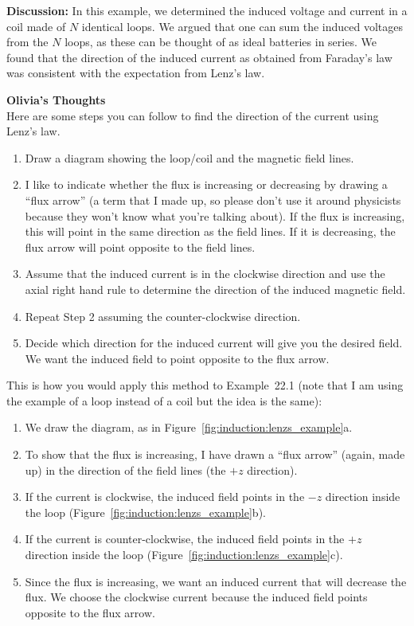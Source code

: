 \begin{framed}
\begin{framed}
\textbf{Discussion:} In this example, we determined the induced voltage and current in a coil made of $N$ identical loops. We argued that one can sum the induced voltages from the $N$ loops, as these can be thought of as ideal batteries in series. We found that the direction of the induced current as obtained from Faraday's law was consistent with the expectation from Lenz's law.
\end{framed}
\end{framed}

\begin{framed}
\textbf{Olivia's Thoughts}\\
Here are some steps you can follow to find the direction of the current using Lenz's law.

\begin{enumerate}
\item Draw a diagram showing the loop/coil and the magnetic field lines.
\item I like to indicate whether the flux is increasing or decreasing by drawing a ``flux arrow'' (a term that I made up, so please don't use it around physicists because they won't know what you're talking about). If the flux is increasing, this will point in the same direction as the field lines. If it is decreasing, the flux arrow will point opposite to the field lines.
\item Assume that the induced current is in the clockwise direction and use the axial right hand rule to determine the direction of the induced magnetic field.
\item Repeat Step 2 assuming the counter-clockwise direction.
\item Decide which direction for the induced current will give you the desired field. We want the induced field to point opposite to the flux arrow.
\end{enumerate}

This is how you would apply this method to Example~22.1 (note that I am using the example of a loop instead of a coil but the idea is the same):

\begin{enumerate}
\item We draw the diagram, as in Figure~\ref{fig:induction:lenzs_example}a.
\item To show that the flux is increasing, I have drawn a ``flux arrow'' (again, made up) in the direction of the field lines (the $+z$ direction).
\item If the current is clockwise, the induced field points in the $-z$ direction inside the loop (Figure~\ref{fig:induction:lenzs_example}b).
\item If the current is counter-clockwise, the induced field points in the $+z$ direction inside the loop (Figure~\ref{fig:induction:lenzs_example}c).
\item Since the flux is increasing, we want an induced current that will decrease the flux. We choose the clockwise current because the induced field points opposite to the flux arrow.
\end{enumerate}


\end{framed}
